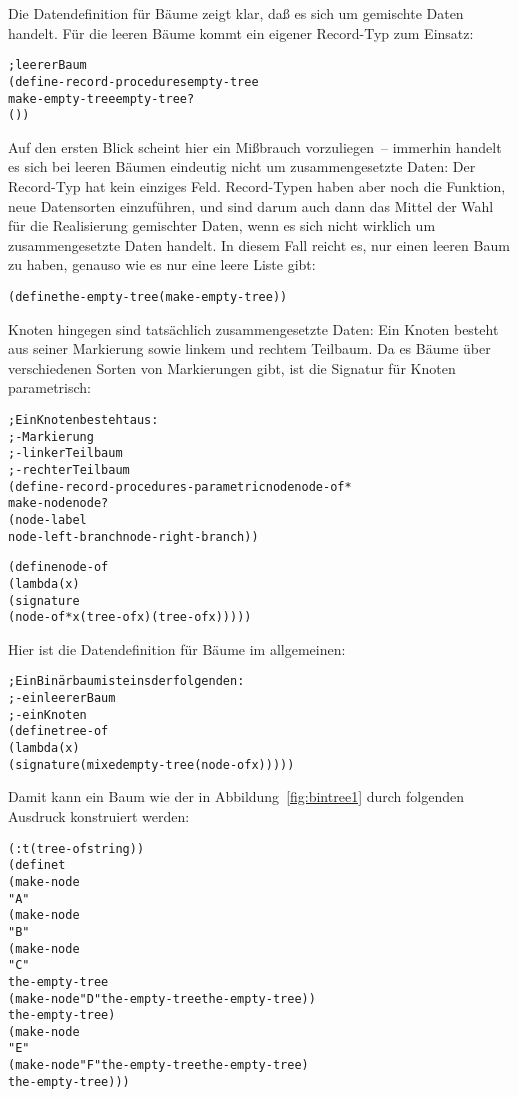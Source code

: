 Die Datendefinition für Bäume zeigt klar, daß es sich um gemischte
Daten handelt.  Für die leeren Bäume kommt ein eigener Record-Typ zum
Einsatz:
%
\begin{alltt}
;  leerer Baum
(define-record-procedures empty-tree
  make-empty-tree empty-tree?
  ())
\end{alltt}
%
Auf den ersten Blick scheint hier ein Mißbrauch vorzuliegen~--
immerhin handelt es sich bei leeren Bäumen eindeutig nicht um
zusammengesetzte Daten: Der Record-Typ
hat kein einziges Feld.  Record-Typen haben aber noch die 
Funktion, neue Datensorten einzuführen, und sind darum auch dann das
Mittel der Wahl für die Realisierung gemischter Daten,
wenn es sich nicht wirklich um zusammengesetzte Daten
handelt.  In diesem Fall reicht es, nur einen leeren
Baum zu haben, genauso wie es nur eine leere Liste gibt:
%
\begin{alltt}
(define the-empty-tree (make-empty-tree))
\end{alltt}
%
Knoten hingegen sind tatsächlich zusammengesetzte Daten: Ein Knoten
besteht aus seiner Markierung sowie linkem und rechtem
Teilbaum.  Da es Bäume über verschiedenen Sorten von Markierungen
gibt, ist die Signatur für Knoten parametrisch:
%
\begin{alltt}
; Ein Knoten besteht aus:
; - Markierung
; - linker Teilbaum
; - rechter Teilbaum
(define-record-procedures-parametric node node-of*
 make-node node?
 (node-label
  node-left-branch node-right-branch))

(define node-of
 (lambda (x)
   (signature
    (node-of* x (tree-of x) (tree-of x)))))
\end{alltt}
%
Hier ist die Datendefinition für Bäume im allgemeinen:
%
\begin{alltt}
; Ein Binärbaum ist eins der folgenden:
; - ein leerer Baum
; - ein Knoten
(define tree-of
 (lambda (x)
   (signature (mixed empty-tree (node-of x)))))
\end{alltt}
%
Damit kann ein Baum wie der in Abbildung~\ref{fig:bintree1} durch
folgenden Ausdruck konstruiert werden:
%
\begin{alltt}
(: t (tree-of string))
(define t
  (make-node
   "A"
   (make-node
    "B"
    (make-node
     "C"
     the-empty-tree
     (make-node "D" the-empty-tree the-empty-tree))
    the-empty-tree)
   (make-node
    "E"
    (make-node "F" the-empty-tree the-empty-tree)
    the-empty-tree)))
\end{alltt}
